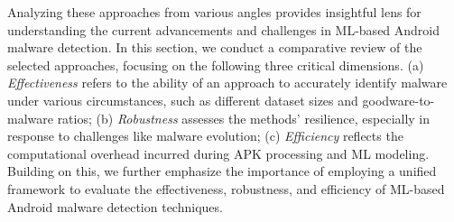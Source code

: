 Analyzing these approaches from various angles provides insightful lens for understanding the current advancements and challenges in ML-based Android malware detection.
In this section, we conduct a comparative review of the selected approaches, focusing on the following three critical dimensions.
(a) \textit{Effectiveness} refers to the ability of an approach to accurately identify malware under various circumstances, such as different dataset sizes and goodware-to-malware ratios;
(b) \textit{Robustness} assesses the methods' resilience, especially in response to challenges like malware evolution;
(c) \textit{Efficiency} reflects the computational overhead incurred during APK processing and ML modeling.
Building on this, we further emphasize the importance of employing a unified framework to evaluate the effectiveness, robustness, and efficiency of ML-based Android malware detection techniques.






